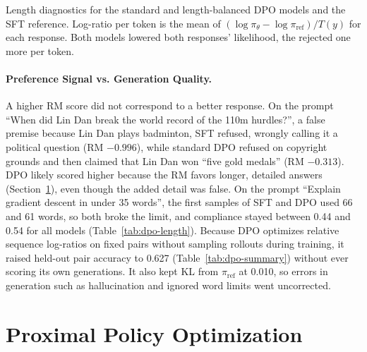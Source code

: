 \documentclass{article}
\newcommand{\tablebody}[1]{\small\setlength{\tabcolsep}{4pt}\begin{adjustbox}{max width=\linewidth}\end{adjustbox}}
\begin{document}
\begin{table}[!htb]
  \centering
  \caption{Length diagnostics for the standard and length-balanced DPO models and the SFT reference. Log-ratio per token is the mean of $(\log\pi_\theta - \log\pi_{\text{ref}})/T(y)$ for each response. Both models lowered both responses' likelihood, the rejected one more per token.}
  \label{tab:dpo-length}
  \tablebody{tables/t1_length.tex}
\end{table}

\paragraph{Preference Signal vs. Generation Quality.} A higher RM score did not correspond to a better response. On the prompt ``When did Lin Dan break the world record of the 110m hurdles?'', a false premise because Lin Dan plays badminton, SFT refused, wrongly calling it a political question (RM $-0.996$), while standard DPO refused on copyright grounds and then claimed that Lin Dan won ``five gold medals'' (RM $-0.313$). DPO likely scored higher because the RM favors longer, detailed answers (Section~\ref{sec:ppo}), even though the added detail was false. On the prompt ``Explain gradient descent in under 35 words'', the first samples of SFT and DPO used 66 and 61 words, so both broke the limit, and compliance stayed between 0.44 and 0.54 for all models (Table~\ref{tab:dpo-length}). Because DPO optimizes relative sequence log-ratios on fixed pairs without sampling rollouts during training, it raised held-out pair accuracy to 0.627 (Table~\ref{tab:dpo-summary}) without ever scoring its own generations. It also kept KL from $\pi_{\text{ref}}$ at 0.010, so errors in generation such as hallucination and ignored word limits went uncorrected.


\section{Proximal Policy Optimization}
\label{sec:ppo}
\end{document}
